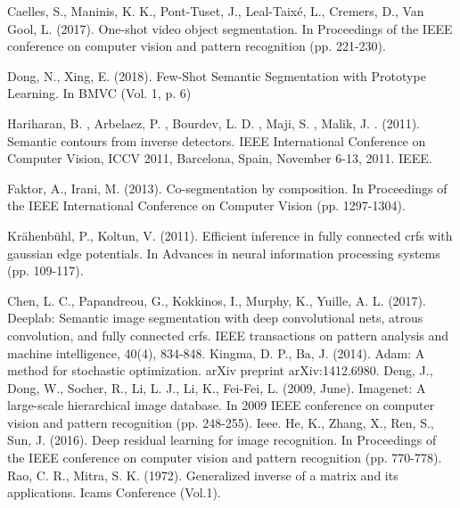 \documentclass[runningheads]{llncs}
\begin{document}
\begin{thebibliography}{}
Caelles, S., Maninis, K. K., Pont-Tuset, J., Leal-Taixé, L., Cremers, D., Van Gool, L. (2017). One-shot video object segmentation. In Proceedings of the IEEE conference on computer vision and pattern recognition (pp. 221-230).

Dong, N., Xing, E. (2018). Few-Shot Semantic Segmentation with Prototype Learning. In BMVC (Vol. 1, p. 6)

Hariharan, B. , Arbelaez, P. , Bourdev, L. D. , Maji, S. , Malik, J. . (2011). Semantic contours from inverse detectors. IEEE International Conference on Computer Vision, ICCV 2011, Barcelona, Spain, November 6-13, 2011. IEEE.

Faktor, A., Irani, M. (2013). Co-segmentation by composition. In Proceedings of the IEEE International Conference on Computer Vision (pp. 1297-1304).

Krähenbühl, P., Koltun, V. (2011). Efficient inference in fully connected crfs with gaussian edge potentials. In Advances in neural information processing systems (pp. 109-117).

Chen, L. C., Papandreou, G., Kokkinos, I., Murphy, K., Yuille, A. L. (2017). Deeplab: Semantic image segmentation with deep convolutional nets, atrous convolution, and fully connected crfs. IEEE transactions on pattern analysis and machine intelligence, 40(4), 834-848.
Kingma, D. P., Ba, J. (2014). Adam: A method for stochastic optimization. arXiv preprint arXiv:1412.6980.
Deng, J., Dong, W., Socher, R., Li, L. J., Li, K., Fei-Fei, L. (2009, June). Imagenet: A large-scale hierarchical image database. In 2009 IEEE conference on computer vision and pattern recognition (pp. 248-255). Ieee.
He, K., Zhang, X., Ren, S., Sun, J. (2016). Deep residual learning for image recognition. In Proceedings of the IEEE conference on computer vision and pattern recognition (pp. 770-778).
Rao, C. R., Mitra, S. K. (1972). Generalized inverse of a matrix and its applications. Icams Conference (Vol.1).
\end{thebibliography}
\end{document}
